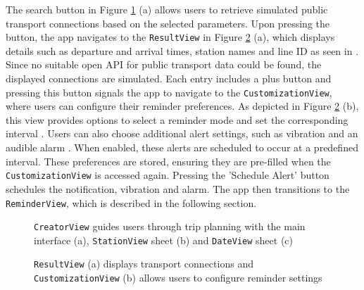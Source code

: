The search button  in Figure \ref{fig:creatorview} (a) allows users to retrieve simulated public transport connections based on the selected parameters. 
Upon pressing the button, the app navigates to the \lstinline{ResultView} in Figure \ref{fig:customizationview} (a), which displays details such as departure and arrival times, station names and line ID as seen in . 
Since no suitable open \acs{API} for public transport data could be found, the displayed connections are simulated.
Each entry includes a plus button  and pressing this button signals the app to navigate to the \lstinline{CustomizationView}, where users can configure their reminder preferences. 
As depicted in Figure \ref{fig:customizationview} (b), this view provides options to select a reminder mode  and set the corresponding interval . 
Users can also choose additional alert settings, such as vibration  and an audible alarm . 
When enabled, these alerts are scheduled to occur at a predefined interval.
These preferences are stored, ensuring they are pre-filled when the \lstinline{CustomizationView} is accessed again. 
Pressing the 'Schedule Alert' button  schedules the notification, vibration and alarm. 
The app then transitions to the \lstinline{ReminderView}, which is described in the following section.

\begin{figure}[H]%
    \centering
    \qquad
    \qquad
    \caption{\lstinline{CreatorView} guides users through trip planning with the main interface (a), \lstinline{StationView} sheet (b) and \lstinline{DateView} sheet (c)}%
    \label{fig:creatorview}%
\end{figure}

\begin{figure}[H]%
    \centering
    \qquad
    \caption{\lstinline{ResultView} (a) displays transport connections and \lstinline{CustomizationView} (b) allows users to configure reminder settings}%
    \label{fig:customizationview}%
\end{figure}


